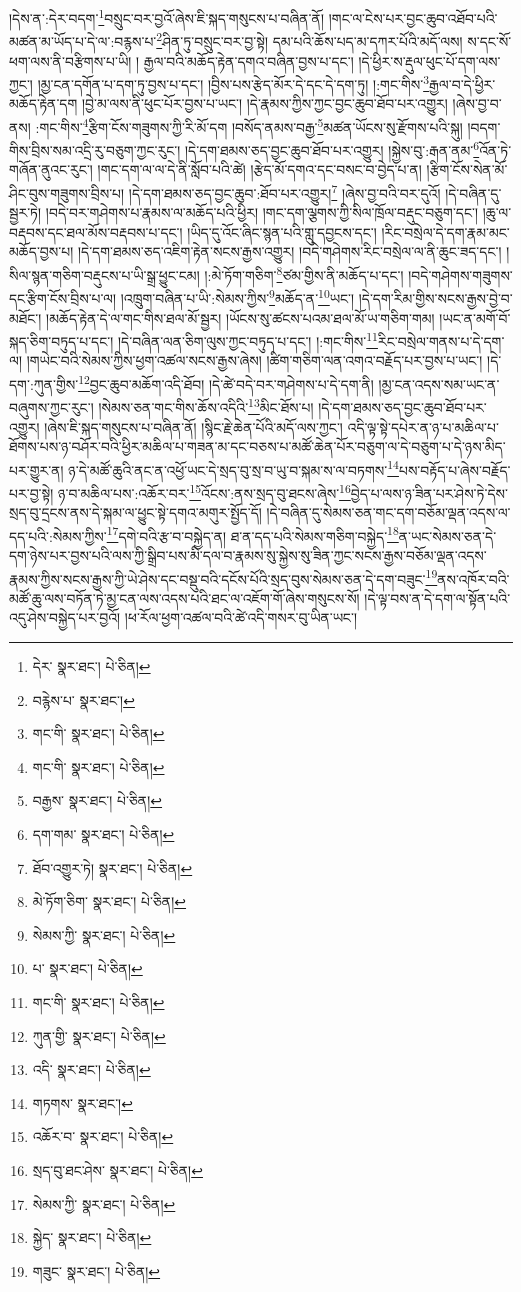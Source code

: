 །དེས་ན་:དེར་བདག་\footnote{དེར་  སྣར་ཐང་།  པེ་ཅིན། }བསྲུང་བར་བྱའོ་ཞེས་ཇི་སྐད་གསུངས་པ་བཞིན་ནོ། །གང་ལ་ངེས་པར་བྱང་ཆུབ་འཐོབ་པའི་མཚན་མ་ཡོད་པ་དེ་ལ་:བརྙས་པ་\footnote{བརྙེས་པ་  སྣར་ཐང་། }ཤིན་ཏུ་བསྲུང་བར་བྱ་སྟེ། དམ་པའི་ཆོས་པད་མ་དཀར་པོའི་མདོ་ལས། ས་དང་སོ་ཕག་ལས་ནི་བརྩིགས་པ་ཡི། །
རྒྱལ་བའི་མཆོད་རྟེན་དགའ་བཞིན་བྱས་པ་དང་། །དེ་ཕྱིར་ས་རྡུལ་ཕུང་པོ་དག་ལས་ཀྱང་། །མྱ་ངན་དགོན་པ་དག་ཏུ་བྱས་པ་དང་། །བྱིས་པས་རྩེད་མོར་དེ་དང་དེ་དག་ཏུ། །:གང་གིས་\footnote{གང་གི་  སྣར་ཐང་།  པེ་ཅིན། }རྒྱལ་བ་དེ་ཕྱིར་མཆོད་རྟེན་དག །བྱེ་མ་ལས་ནི་ཕུང་པོར་བྱས་པ་ཡང་། །དེ་རྣམས་ཀྱིས་ཀྱང་བྱང་ཆུབ་ཐོབ་པར་འགྱུར། །ཞེས་བྱ་བ་ནས། :གང་གིས་\footnote{གང་གི་  སྣར་ཐང་།  པེ་ཅིན། }རྩིག་ངོས་གཟུགས་ཀྱི་རི་མོ་དག །བསོད་ནམས་བརྒྱ་\footnote{བརྒྱས་  སྣར་ཐང་།  པེ་ཅིན། }མཚན་ཡོངས་སུ་རྫོགས་པའི་སྐུ། །བདག་གིས་བྲིས་སམ་འདྲི་རུ་བཅུག་ཀྱང་རུང་། །དེ་དག་ཐམས་ཅད་བྱང་ཆུབ་ཐོབ་པར་འགྱུར། །སྐྱེས་བུ་:རྒན་ནམ་\footnote{དག་གམ་  སྣར་ཐང་།  པེ་ཅིན། }འོན་ཏེ་གཞོན་ནུའང་རུང་། །གང་དག་ལ་ལ་དེ་ནི་སློབ་པའི་ཚེ། །རྩེད་མོ་དགའ་དང་བསང་བ་བྱེད་པ་ན། །རྩིག་ངོས་སེན་མོ་ཤིང་བུས་གཟུགས་བྲིས་པ། །དེ་དག་ཐམས་ཅད་བྱང་ཆུབ་:ཐོབ་པར་འགྱུར།\footnote{ཐོབ་འགྱུར་ཏེ།  སྣར་ཐང་།  པེ་ཅིན། } །ཞེས་བྱ་བའི་བར་དུའོ། །དེ་བཞིན་དུ་སྦྱར་ཏེ། །བདེ་བར་གཤེགས་པ་རྣམས་ལ་མཆོད་པའི་ཕྱིར། །གང་དག་ལྕགས་ཀྱི་སིལ་ཁྲོལ་བརྡུང་བཅུག་དང་། །ཆུ་ལ་བརྡབས་དང་ཐལ་མོས་བརྡབས་པ་དང་། །ཡིད་དུ་འོང་ཞིང་སྙན་པའི་གླུ་དབྱངས་དང་། །རིང་བསྲེལ་དེ་དག་རྣམ་མང་མཆོད་བྱས་པ། །དེ་དག་ཐམས་ཅད་འཇིག་རྟེན་སངས་རྒྱས་འགྱུར། །བདེ་གཤེགས་རིང་བསྲེལ་ལ་ནི་ཆུང་ཟད་དང་། །སིལ་སྙན་གཅིག་བརྡུངས་པ་ཡི་སྒྲ་ཕྱུང་ངམ། །:མེ་ཏོག་གཅིག་\footnote{མེ་ཏོག་ཅིག་  སྣར་ཐང་།  པེ་ཅིན། }ཙམ་གྱིས་ནི་མཆོད་པ་དང་། །བདེ་གཤེགས་གཟུགས་དང་རྩིག་ངོས་བྲིས་པ་ལ། །འཁྲུག་བཞིན་པ་ཡི་:སེམས་ཀྱིས་\footnote{སེམས་ཀྱི་  སྣར་ཐང་།  པེ་ཅིན། }མཆོད་ན་\footnote{པ་  སྣར་ཐང་།  པེ་ཅིན། }ཡང་། །དེ་དག་རིམ་གྱིས་སངས་རྒྱས་བྱེ་བ་མཐོང་། །མཆོད་རྟེན་དེ་ལ་གང་གིས་ཐལ་མོ་སྦྱར། །ཡོངས་སུ་ཚངས་པའམ་ཐལ་མོ་ཡ་གཅིག་གམ། །ཡང་ན་མགོ་བོ་སྐད་ཅིག་བཏུད་པ་དང་། །དེ་བཞིན་ལན་ཅིག་ལུས་ཀྱང་བཏུད་པ་དང་། །:གང་གིས་\footnote{གང་གི་  སྣར་ཐང་།  པེ་ཅིན། }རིང་བསྲེལ་གནས་པ་དེ་དག་ལ། །གཡེང་བའི་སེམས་ཀྱིས་ཕྱག་འཚལ་སངས་རྒྱས་ཞེས། །ཚིག་གཅིག་ལན་འགའ་བརྗོད་པར་བྱས་པ་ཡང་། །དེ་དག་:ཀུན་གྱིས་\footnote{ཀུན་གྱི་  སྣར་ཐང་།  པེ་ཅིན། }བྱང་ཆུབ་མཆོག་འདི་ཐོབ། །དེ་ཚེ་བདེ་བར་གཤེགས་པ་དེ་དག་ནི། །མྱ་ངན་འདས་སམ་ཡང་ན་བཞུགས་ཀྱང་རུང་། །སེམས་ཅན་གང་གིས་ཆོས་འདིའི་\footnote{འདི་  སྣར་ཐང་།  པེ་ཅིན། }མིང་ཐོས་པ། །དེ་དག་ཐམས་ཅད་བྱང་ཆུབ་ཐོབ་པར་འགྱུར། །ཞེས་ཇི་སྐད་གསུངས་པ་བཞིན་ནོ། །སྙིང་རྗེ་ཆེན་པོའི་མདོ་ལས་ཀྱང་། འདི་ལྟ་སྟེ་དཔེར་ན་ཉ་པ་མཆིལ་པ་ཐོགས་པས་ཉ་བཤོར་བའི་ཕྱིར་མཆིལ་པ་གཟན་མ་དང་བཅས་པ་མཚོ་ཆེན་པོར་བཅུག་ལ་དེ་བཅུག་པ་དེ་ཉས་མིད་པར་གྱུར་ན། ཉ་དེ་མཚོ་ཆུའི་ནང་ན་འཕྱོ་ཡང་དེ་སྲད་བུ་སྲ་བ་ཡུ་བ་སྐམ་ས་ལ་བཏགས་\footnote{གཏགས་  སྣར་ཐང་། }པས་བརྟོད་པ་ཞེས་བརྗོད་པར་བྱ་སྟེ། ཉ་བ་མཆིལ་པས་:འཆོར་བར་\footnote{འཆོར་བ་  སྣར་ཐང་།  པེ་ཅིན། }འོངས་:ནས་སྲད་བུ་ཐངས་ཞེས་\footnote{སྲད་བུ་ཐང་ཤེས་  སྣར་ཐང་།  པེ་ཅིན། }བྱེད་པ་ལས་ཉ་ཟིན་པར་ཤེས་ཏེ་དེས་སྲད་བུ་དྲངས་ནས་དེ་སྐམ་ལ་ཕྱུང་སྟེ་དགའ་མགུར་སྤྱོད་དོ། །དེ་བཞིན་དུ་སེམས་ཅན་གང་དག་བཅོམ་ལྡན་འདས་ལ་དད་པའི་:སེམས་ཀྱིས་\footnote{སེམས་ཀྱི་  སྣར་ཐང་།  པེ་ཅིན། }དགེ་བའི་རྩ་བ་བསྐྱེད་ན། ཐ་ན་དད་པའི་སེམས་གཅིག་བསྐྱེད་\footnote{སྐྱེད་  སྣར་ཐང་།  པེ་ཅིན། }ན་ཡང་སེམས་ཅན་དེ་དག་ཉེས་པར་བྱས་པའི་ལས་ཀྱི་སྒྲིབ་པས་མི་དལ་བ་རྣམས་སུ་སྐྱེས་སུ་ཟིན་ཀྱང་སངས་རྒྱས་བཅོམ་ལྡན་འདས་རྣམས་ཀྱིས་སངས་རྒྱས་ཀྱི་ཡེ་ཤེས་དང་བསྡུ་བའི་དངོས་པོའི་སྲད་བུས་སེམས་ཅན་དེ་དག་བཟུང་\footnote{གཟུང་  སྣར་ཐང་།  པེ་ཅིན། }ནས་འཁོར་བའི་མཚོ་ཆུ་ལས་བཏོན་ཏེ་མྱ་ངན་ལས་འདས་པའི་ཐང་ལ་འཇོག་གོ་ཞེས་གསུངས་སོ། །དེ་ལྟ་བས་ན་དེ་དག་ལ་སྟོན་པའི་འདུ་ཤེས་བསྐྱེད་པར་བྱའོ། །ཕ་རོལ་ཕྱག་འཚལ་བའི་ཚེ་འདི་གསར་བུ་ཡིན་ཡང་། 
